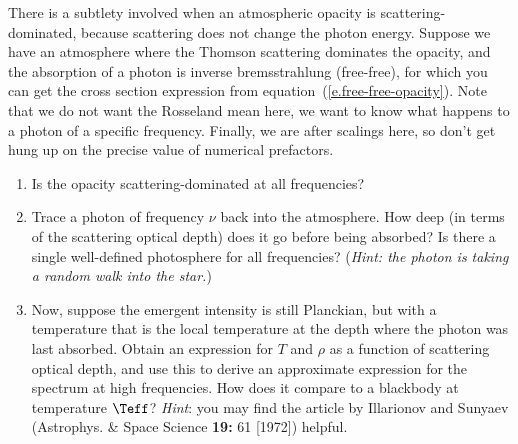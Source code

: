 \begin{exercisebox} There is a subtlety involved when an atmospheric opacity is scattering-dominated, because scattering does not change the photon energy. Suppose we have an atmosphere where the Thomson scattering dominates the opacity, and the absorption of a photon is inverse bremsstrahlung (free-free), for which you can get the cross section expression from equation~(\ref{e.free-free-opacity}).  Note that we do not want the Rosseland mean here, we want to know what happens to a photon of a specific frequency. Finally, we are after scalings here, so don't get hung up on the precise value of numerical prefactors.
\begin{enumerate}
\item Is the opacity scattering-dominated at all frequencies?
\item Trace a photon of frequency $\nu$ back into the atmosphere.  How deep (in terms of the scattering optical depth) does it go before being absorbed? Is there a single well-defined photosphere for all frequencies? (\emph{Hint: the photon is taking a random walk into the star.})
\item Now, suppose the emergent intensity is still Planckian, but with a temperature that is the local temperature at the depth where the photon was last absorbed. Obtain an expression for $T$ and $\rho$ as a function of scattering optical depth, and use this to derive an approximate expression for the spectrum at high frequencies.  How does it compare to a blackbody at temperature $\Teff$?
\emph{Hint}: you may find the article by Illarionov and Sunyaev (Astrophys. \& Space Science \textbf{19:} 61 [1972]) helpful.
\end{enumerate}
\end{exercisebox}

